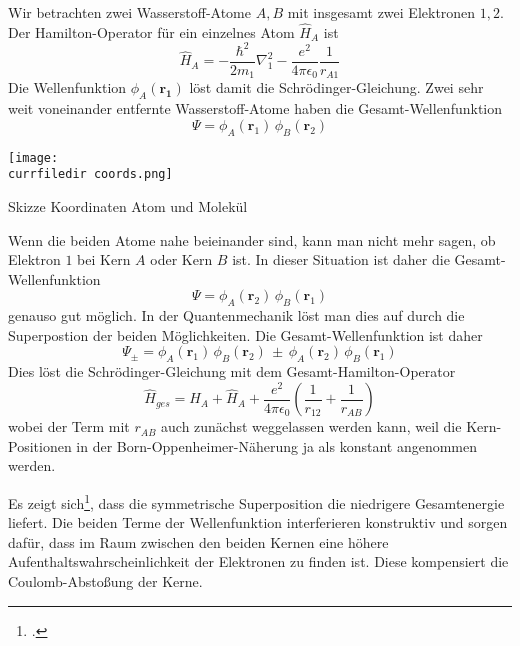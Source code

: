 Wir betrachten zwei Wasserstoff-Atome $A,B$ mit insgesamt zwei Elektronen $1,2$. Der Hamilton-Operator für ein einzelnes Atom $\hat{H}_A$ ist
\begin{equation}
  \hat{H}_A = - \frac{\hbar^2}{2 m_1} \nabla_1^2 - \frac{e^2}{4 \pi \epsilon_0} \frac{1}{r_{A1}}
\end{equation}
Die Wellenfunktion $\phi_A(\mathbf{r_1})$ löst damit die Schrödinger-Gleichung. Zwei sehr weit voneinander entfernte Wasserstoff-Atome haben die Gesamt-Wellenfunktion
\begin{equation}
 \Psi = \phi_A(\mathbf{r}_1) \, \phi_B(\mathbf{r}_2)
\end{equation}
%
\begin{marginfigure}
\texttt{[image: \\currfiledir coords.png]}
\caption{Skizze Koordinaten Atom und Molekül}
\end{marginfigure}
%
Wenn die beiden Atome nahe beieinander sind, kann man nicht mehr sagen, ob Elektron $1$ bei Kern $A$ oder Kern $B$ ist. In dieser Situation ist daher die Gesamt-Wellenfunktion 
\begin{equation}
 \Psi = \phi_A(\mathbf{r}_2) \, \phi_B(\mathbf{r}_1)
\end{equation}
genauso gut möglich. In der Quantenmechanik löst man dies auf durch die Superpostion der beiden Möglichkeiten. Die Gesamt-Wellenfunktion  ist daher 
\begin{equation}
 \Psi_{\pm} = \phi_A(\mathbf{r}_1) \, \phi_B(\mathbf{r}_2) \, \pm \, \phi_A(\mathbf{r}_2) \, \phi_B(\mathbf{r}_1)
\end{equation}
Dies löst die Schrödinger-Gleichung mit dem Gesamt-Hamilton-Operator
\begin{equation}
  \hat{H}_{ges} =  \hat{H}_A + \hat{H}_A  + \frac{e^2}{4 \pi \epsilon_0} \left( \frac{1}{r_{12}} + \frac{1}{r_{AB}} \right)
\end{equation}
wobei der Term mit $r_{AB}$ auch zunächst weggelassen werden kann, weil die Kern-Positionen in der Born-Oppenheimer-Näherung ja als konstant angenommen werden.



Es zeigt sich\footcite[Kapitel 4.4.2]{Haken_wolf_II}, dass die symmetrische Superposition die niedrigere Gesamtenergie liefert. Die beiden Terme der Wellenfunktion interferieren konstruktiv und sorgen dafür, dass im Raum zwischen den beiden Kernen eine höhere Aufenthaltswahrscheinlichkeit der Elektronen zu finden ist. Diese kompensiert die Coulomb-Abstoßung der Kerne.

